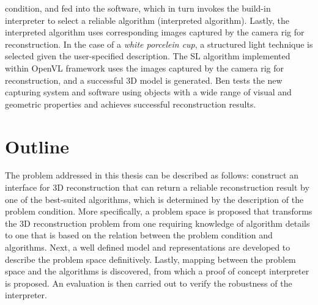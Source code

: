 condition, and fed into the software, which in turn invokes the build-in interpreter to select a reliable algorithm (interpreted algorithm). Lastly, the interpreted algorithm uses corresponding images captured by the camera rig for reconstruction. In the case of a \textit{white porcelein cup}, a structured light technique is selected given the user-specified description. The SL algorithm implemented within OpenVL framework uses the images captured by the camera rig for reconstruction, and a successful 3D model is generated. Ben tests the new capturing system and software using objects with a wide range of visual and geometric properties and achieves successful reconstruction results.





\section{Outline}
The problem addressed in this thesis can be described as follows: construct an interface for 3D reconstruction that can return a reliable reconstruction result by one of the best-suited algorithms, which is determined by the description of the problem condition. More specifically, a problem space is proposed that transforms the 3D reconstruction problem from one requiring knowledge of algorithm details to one that is based on the relation between the problem condition and algorithms. Next, a well defined model and representations are developed to describe the problem space definitively. Lastly, mapping between the problem space and the algorithms is discovered, from which a proof of concept interpreter is proposed. An evaluation is then carried out to verify the robustness of the interpreter.

